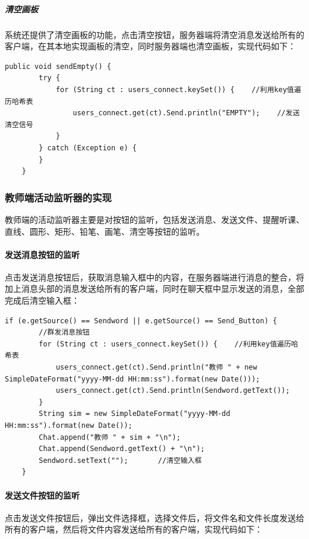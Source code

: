 \documentclass[UTF8,12pt]{article}
\begin{document}
\subparagraph{清空画板}
系统还提供了清空画板的功能，点击清空按钮，服务器端将清空消息发送给所有的客户端，在其本地实现画板的清空，同时服务器端也清空画板，实现代码如下：
\begin{lstlisting}[title=清空画板,frame=shadowbox]
    public void sendEmpty() {
        try {
            for (String ct : users_connect.keySet()) {    //利用key值遍历哈希表
                users_connect.get(ct).Send.println("EMPTY");    //发送清空信号
            }
        } catch (Exception e) {
        }
    }
\end{lstlisting}

\subsubsection{教师端活动监听器的实现}
教师端的活动监听器主要是对按钮的监听，包括发送消息、发送文件、提醒听课、直线、圆形、矩形、铅笔、画笔、清空等按钮的监听。

\paragraph{发送消息按钮的监听}
点击发送消息按钮后，获取消息输入框中的内容，在服务器端进行消息的整合，将加上消息头部的消息发送给所有的客户端，同时在聊天框中显示发送的消息，全部完成后清空输入框：

\begin{lstlisting}[title=发送消息按钮的监听,frame=shadowbox]
    if (e.getSource() == Sendword || e.getSource() == Send_Button) {
        //群发消息按钮
        for (String ct : users_connect.keySet()) {    //利用key值遍历哈希表
            users_connect.get(ct).Send.println("教师 " + new SimpleDateFormat("yyyy-MM-dd HH:mm:ss").format(new Date()));
            users_connect.get(ct).Send.println(Sendword.getText());
        }
        String sim = new SimpleDateFormat("yyyy-MM-dd HH:mm:ss").format(new Date());
        Chat.append("教师 " + sim + "\n");
        Chat.append(Sendword.getText() + "\n");
        Sendword.setText("");       //清空输入框
    }
\end{lstlisting}

\paragraph{发送文件按钮的监听}
点击发送文件按钮后，弹出文件选择框，选择文件后，将文件名和文件长度发送给所有的客户端，然后将文件内容发送给所有的客户端，实现代码如下：
\end{document}
